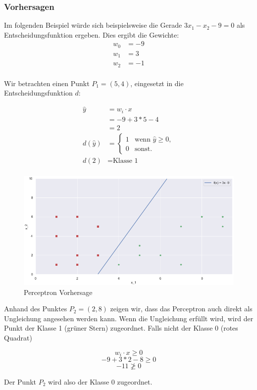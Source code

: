 \begin{flushleft}
\newpage
\subsubsection{Vorhersagen}
Im folgenden Beispiel würde sich beispielsweise die Gerade $3x_{1} - x_{2} - 9 = 0$ als Entscheidungsfunktion ergeben. Dies ergibt die Gewichte:
\begin{align*}
	 w_{0} &= -9\\
	 w_{1} &= 3 \\
	 w_{2} &= -1 \\
\end{align*}



Wir betrachten einen Punkt $P_{1} = (5,4)$, eingesetzt in die Entscheidungsfunktion $d$:

\begin{align*}
\hat{y} &= w_{i}\cdot x \\
		&= -9 + 3*5 - 4 \\
		&= 2 \\
d(\hat{y}) &= \begin{cases}
       		1 & \text{wenn } \hat{y} \geq 0, \\
       		0 & \text{sonst.}
       		\end{cases} \\
d(2) &= \text{Klasse 1} \\
\end{align*}

\begin{figure}[H]
	\centering
	\label{fig:perceptron_prediction}
	\includegraphics[scale=0.5]{figures/perceptron_line}
	\caption{Perceptron Vorhersage}
\end{figure}

Anhand des Punktes $P_{2} = (2,8)$ zeigen wir, dass das Perceptron auch direkt als Ungleichung angesehen werden kann. Wenn die Ungleichung erfüllt wird, wird der Punkt der Klasse 1 (grüner Stern) zugeordnet. Falls nicht der Klasse 0 (rotes Quadrat)

$$w_{i}\cdot x \geq 0$$
$$ -9 + 3*2 - 8\geq 0$$
$$ -11 \ngeq 0$$

Der Punkt $P_{2}$ wird also der Klasse 0 zugeordnet.

\end{flushleft}

